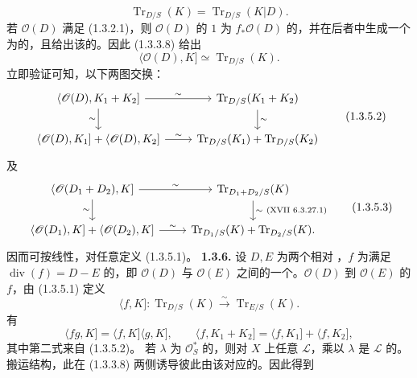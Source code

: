 \begin{equation}\operatorname{Tr}_{D/S}(K)=\operatorname{Tr}_{D/S}(K|D).\tag{1.3.5.0}\end{equation}
若 $\mathscr O(D)$ 满足 (1.3.2.1)，则 $\mathscr O(D)$ 的 $1$ 为 $f_*\mathscr O(D)$ 的，并在后者中生成一个为的，且给出该的。因此 (1.3.3.8) 给出
\begin{equation}\langle\mathscr O(D),K]\simeq\operatorname{Tr}_{D/S}(K).\tag{1.3.5.1}\end{equation}
立即验证可知，以下两图交换：
\begin{equation}\begin{tikzcd}\langle\mathscr O(D),K_1+K_2]\ar[r,"\sim"]\ar[d,"\sim"']&\operatorname{Tr}_{D/S}(K_1+K_2)\ar[d,"\sim"]\\\langle\mathscr O(D),K_1]+\langle\mathscr O(D),K_2]\ar[r,"\sim"]&\operatorname{Tr}_{D/S}(K_1)+\operatorname{Tr}_{D/S}(K_2)\end{tikzcd}\tag{1.3.5.2}\end{equation}
及
\begin{equation}\begin{tikzcd}\langle\mathscr O(D_1+D_2),K]\ar[r,"\sim"]\ar[d,"\sim"']&\operatorname{Tr}_{D_1+D_2/S}(K)\ar[d,"{\sim\ (\text{XVII }6.3.27.1)}"]\\\langle\mathscr O(D_1),K]+\langle\mathscr O(D_2),K]\ar[r,"\sim"]&\operatorname{Tr}_{D_1/S}(K)+\operatorname{Tr}_{D_2/S}(K).\end{tikzcd}\tag{1.3.5.3}\end{equation}
因而可按线性，对任意定义 (1.3.5.1)。
\textbf{1.3.6.} 设 $D,E$ 为两个相对 ，$f$ 为满足 $\operatorname{div}(f)=D-E$ 的，即 $\mathscr O(D)$ 与 $\mathscr O(E)$ 之间的一个。$\mathscr O(D)$ 到 $\mathscr O(E)$ 的 $f$，由 (1.3.5.1) 定义
\begin{equation}\langle f,K]:\operatorname{Tr}_{D/S}(K)\xrightarrow\sim\operatorname{Tr}_{E/S}(K).\tag{1.3.6.1}\end{equation}
有
\[\langle fg,K]=\langle f,K]\langle g,K],\qquad\langle f,K_1+K_2]=\langle f,K_1]+\langle f,K_2],\]
其中第二式来自 (1.3.5.2)。
若 $\lambda$ 为 $\mathscr O_S^*$ 的，则对 $X$ 上任意 $\mathscr L$，乘以 $\lambda$ 是 $\mathscr L$ 的。搬运结构，此在 (1.3.3.8) 两侧诱导彼此由该对应的。因此得到
